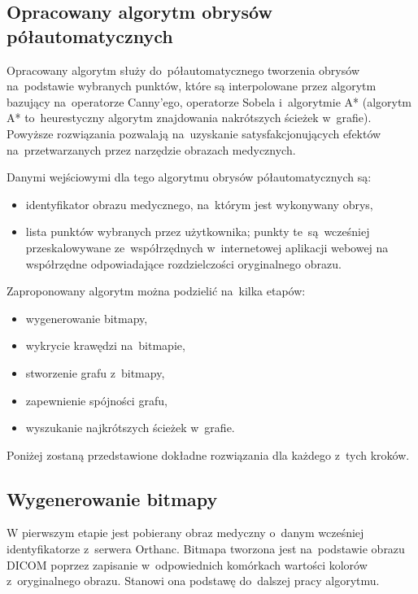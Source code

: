 \documentclass[a4paper,11pt,twoside,openright]{report}
\theoremstyle{definition}
\begin{document}
\subsection {Opracowany algorytm obrysów półautomatycznych}

Opracowany algorytm służy do~półautomatycznego tworzenia obrysów na~podstawie wybranych punktów,
które są interpolowane przez algorytm bazujący na~operatorze Canny'ego, operatorze
Sobela i~algorytmie A* (algorytm A* to~heurestyczny algorytm znajdowania nakrótszych ścieżek w~grafie).
Powyższe rozwiązania pozwalają na~uzyskanie satysfakcjonujących efektów na~przetwarzanych
przez narzędzie obrazach medycznych.

Danymi wejściowymi dla tego algorytmu obrysów półautomatycznych są:
\begin{itemize}[noitemsep]
\item {identyfikator obrazu medycznego, na~którym jest wykonywany obrys,}
\item {lista punktów wybranych przez użytkownika; punkty te~są~wcześniej
przeskalowywane ze~współrzędnych w~internetowej aplikacji webowej
na współrzędne odpowiadające rozdzielczości oryginalnego obrazu.}
\end{itemize}


Zaproponowany algorytm można podzielić na~kilka etapów:

\begin{itemize}[noitemsep]
\item {wygenerowanie bitmapy,}
\item {wykrycie krawędzi na~bitmapie,}
\item {stworzenie grafu z~bitmapy,}
\item {zapewnienie spójności grafu,}
\item {wyszukanie najkrótszych ścieżek w~grafie.}
\end{itemize}

Poniżej zostaną przedstawione dokładne rozwiązania dla każdego z~tych kroków.

\subsection {Wygenerowanie bitmapy}

W pierwszym etapie jest pobierany obraz medyczny o~danym wcześniej
identyfikatorze z~serwera Orthanc. Bitmapa tworzona jest na~podstawie obrazu DICOM poprzez
zapisanie w~odpowiednich komórkach wartości kolorów z~oryginalnego obrazu.
Stanowi ona podstawę do~dalszej pracy algorytmu.
\end{document}
